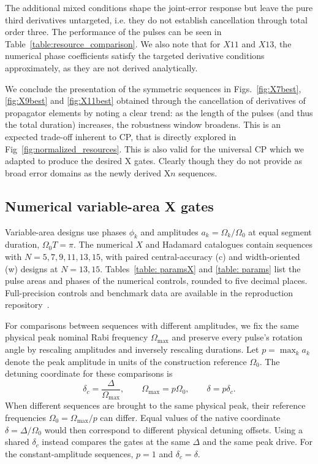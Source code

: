 \documentclass[10pt,aps,twocolumn,pra,floatfix,superscriptaddress]{revtex4-2}
\begin{document}
The additional mixed conditions shape the joint-error response but leave the pure third derivatives untargeted, i.e. they do not establish cancellation through total order three. The performance of the pulses can be seen in Table~\ref{table:resource_comparison}. We also note that for $X11$ and $X13$, the numerical phase coefficients satisfy the targeted derivative conditions approximately, as they are not derived analytically.

We conclude the presentation of the symmetric sequences in Figs.~\ref{fig:X7best}, \ref{fig:X9best} and \ref{fig:X11best} obtained through the cancellation of derivatives of propagator elements by noting a clear trend: as the length of the pulses (and thus the total duration) increases, the robustness window broadens. This is an expected trade-off inherent to CP, that is directly explored in Fig~\ref{fig:normalized_resources}.
This is also valid for the  universal CP which we adapted to produce the desired X gates.
Clearly though they do not provide as broad error domains as the newly derived X$n$ sequences.

\subsection{Numerical variable-area X gates}
\label{Sec:variable_X}

Variable-area designs use phases $\phi_k$ and amplitudes $a_k=\Omega_k/\Omega_0$ at equal segment duration, $\Omega_0T=\pi$. The numerical $X$ and Hadamard catalogues contain sequences with $N=5,7,9,11,13,15$, with paired central-accuracy (c) and width-oriented (w) designs at $N=13,15$. Tables~\ref{table: paramsX} and \ref{table: params} list the pulse areas and phases of the numerical controls, rounded to five decimal places. Full-precision controls and benchmark data are available in the reproduction repository~\cite{my_github_repo}.

For comparisons between sequences with different amplitudes, we fix the same physical peak nominal Rabi frequency $\Omega_{\max}$ and preserve every pulse's rotation angle by rescaling amplitudes and inversely rescaling durations. Let $p=\max_k a_k$ denote the peak amplitude in units of the construction reference $\Omega_0$. The detuning coordinate for these comparisons is
\begin{equation}
\delta_c=\frac{\Delta}{\Omega_{\max}},\qquad
\Omega_{\max}=p\Omega_0,\qquad
\delta=p\delta_c.
\label{eq:common_peak_detuning}
\end{equation}
When different sequences are brought to the same physical peak, their reference frequencies $\Omega_0=\Omega_{\max}/p$ can differ. Equal values of the native coordinate $\delta=\Delta/\Omega_0$ would then correspond to different physical detuning offsets. Using a shared $\delta_c$ instead compares the gates at the same $\Delta$ and the same peak drive. For the constant-amplitude sequences, $p=1$ and $\delta_c=\delta$.
\end{document}
